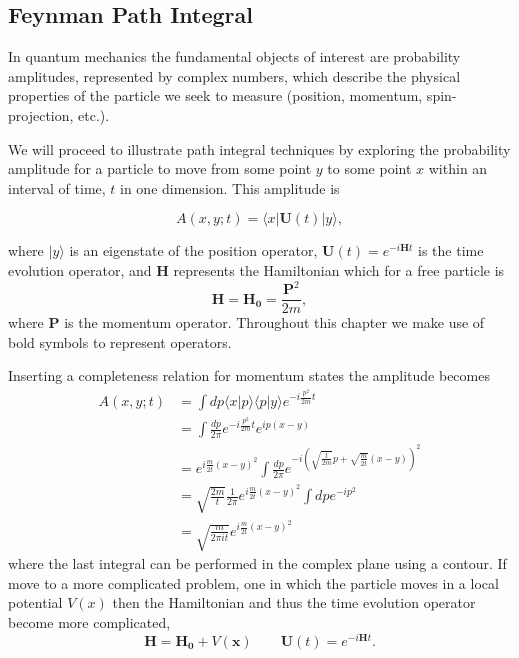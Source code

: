 \subsection{Feynman Path Integral} 
In quantum mechanics the fundamental objects of interest are probability amplitudes, represented by complex numbers, which describe the physical properties of the particle we seek to measure (position, momentum, spin-projection, etc.). 

We will proceed to illustrate path integral techniques by exploring the probability amplitude for a particle to move from some point $y$ to some point $x$ within an interval of time, $t$ in one dimension. This amplitude is 

\begin{equation*}
A(x,y;t) = \langle x | \mathbf{U}(t) | y \rangle ,
\end{equation*}

where $|y\rangle$ is an eigenstate of the position operator, $\mathbf{U}(t) = e^{-i\mathbf{H}t}$ is the time evolution operator, and $\mathbf{H}$ represents the Hamiltonian which for a free particle is 
\begin{equation*}
\mathbf{H}=\mathbf{H_0} =  \frac{\mathbf{P}^2}{2m},
\end{equation*}
where $\mathbf{P}$ is the momentum operator. Throughout this chapter we make use of bold symbols to represent operators.

 Inserting a completeness relation for momentum states the amplitude becomes 
\begin{align*}
A(x,y;t) &= \int dp \langle x |p \rangle \langle p | y \rangle e^{-i\frac{p^2}{2m}t} \\
&=\int \frac{dp}{2\pi}e^{-i\frac{p^2}{2m}t} e^{ip(x-y)} \\
&= e^{i \frac{m}{2t}(x-y)^2} \int \frac{dp}{2\pi} e^{-i\left(\sqrt{\frac{t}{2m}}p + \sqrt{\frac{m}{2t}}(x-y)\right)^2} \\
&= \sqrt{\frac{2m}{t}}\frac{1}{2\pi}e^{i \frac{m}{2t}(x-y)^2}\int dp e^{-ip^2} \\
&= \sqrt{\frac{m}{2\pi it}}e^{i \frac{m}{2t}(x-y)^2}
\end{align*}
where the last integral can be performed in the complex plane using a contour. If move to a more complicated problem, one in which the particle moves in a local potential $V(x)$ then the Hamiltonian and thus the time evolution operator become more complicated, 
\begin{equation*}
\mathbf{H} = \mathbf{H_0} + V(\mathbf{x}) \qquad \mathbf{U}(t) = e^{-i \mathbf{H} t}.
\end{equation*}

